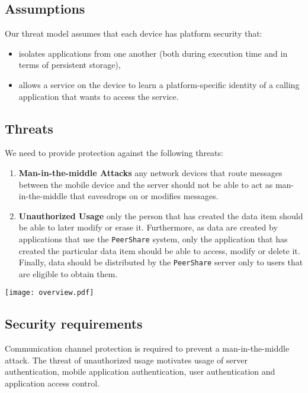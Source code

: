 \documentclass[twocolumn,a4paper,10pt]{article}
\newcommand{\peershare}{\texttt{PeerShare}\xspace}
\begin{document}
\subsection{Assumptions}
Our threat model assumes that each device has platform security that:
\begin{itemize}
\item isolates applications from one another (both during execution time and in terms of persistent storage),
\item allows a service on the device to learn a platform-specific identity of a calling application that wants to access the service.
\end{itemize}





\subsection{Threats}
We need to provide protection against the following threats: 
\begin{enumerate}
\item \textbf{Man-in-the-middle Attacks}  any network devices that route messages between the mobile device and the server should not be able to act as man-in-the-middle that eavesdrops on or modifies messages. \item \textbf{Unauthorized Usage}  only the person that has created the data item should be able to later modify or erase it. Furthermore, as data are created by applications that use the \peershare system, only the application that has created the particular data item should be able to access, modify or delete it. Finally, data should be distributed by the \peershare server only to users that are eligible to obtain them. \end{enumerate}

\begin{figure*}[!ht]
	\centering
	\texttt{[image: overview.pdf]}
    \caption{\peershare architecture.}
	\label{system_overview}
\end{figure*}

\subsection{Security requirements}
Communication channel protection is required to prevent a man-in-the-middle attack. The threat of unauthorized usage motivates usage of server authentication, mobile application authentication, user authentication and application access control.
\end{document}
